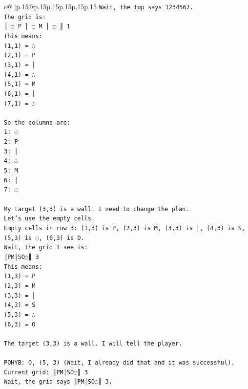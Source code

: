 \documentclass{article}
\begin{document}
{\begin{supertabular}{c@{$\;$}|p{.15\linewidth}@{}p{.15\linewidth}p{.15\linewidth}p{.15\linewidth}p{.15\linewidth}p{.15\linewidth}}
{{{\texttt{Wait, the top says 1234567.} \\
\texttt{The grid is:} \\
\texttt{║ ◌ P │ ◌ M │ ◌ ║ 1} \\
\texttt{This means:} \\
\texttt{(1,1) = ◌} \\
\texttt{(2,1) = P} \\
\texttt{(3,1) = │} \\
\texttt{(4,1) = ◌} \\
\texttt{(5,1) = M} \\
\texttt{(6,1) = │} \\
\texttt{(7,1) = ◌} \\
\\ 
\texttt{So the columns are:} \\
\texttt{1: ◌} \\
\texttt{2: P} \\
\texttt{3: │} \\
\texttt{4: ◌} \\
\texttt{5: M} \\
\texttt{6: │} \\
\texttt{7: ◌} \\
\\ 
\texttt{My target (3,3) is a wall. I need to change the plan.} \\
\texttt{Let's use the empty cells.} \\
\texttt{Empty cells in row 3: (1,3) is P, (2,3) is M, (3,3) is │, (4,3) is S, (5,3) is ◌, (6,3) is O.} \\
\texttt{Wait, the grid I see is:} \\
\texttt{║PM│SO◌║ 3} \\
\texttt{This means:} \\
\texttt{(1,3) = P} \\
\texttt{(2,3) = M} \\
\texttt{(3,3) = │} \\
\texttt{(4,3) = S} \\
\texttt{(5,3) = ◌} \\
\texttt{(6,3) = O} \\
\\ 
\texttt{The target (3,3) is a wall. I will tell the player.} \\
\\ 
\texttt{POHYB: O, (5, 3) (Wait, I already did that and it was successful).} \\
\texttt{Current grid: ║PM│SO◌║ 3} \\
\texttt{Wait, the grid says ║PM│SO◌║ 3.} \\
}}}
\end{supertabular}}
\end{document}
